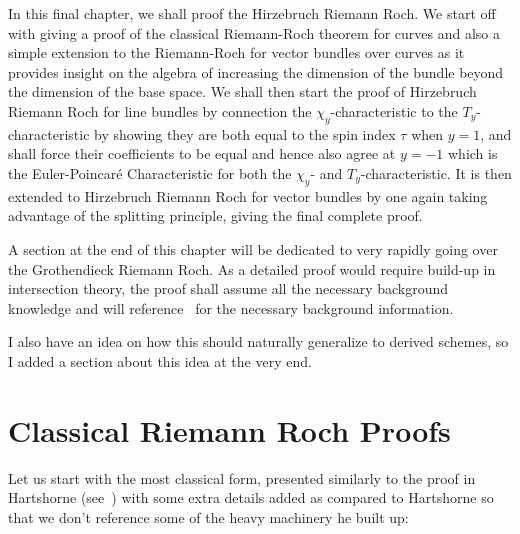 \documentclass{book}
\begin{document}
In this final chapter, we shall proof the Hirzebruch Riemann Roch. We start off with giving a proof of the
classical Riemann-Roch theorem for curves and also a simple extension to the Riemann-Roch for vector bundles
over curves as it provides insight on the algebra of increasing the dimension of the bundle beyond the
dimension of the base space. We shall then start the proof of Hirzebruch Riemann Roch for line bundles by connection the
$\chi_y$-characteristic to the $T_y$-characteristic by showing they are both equal to the spin index $\tau$
when $y =1$, and shall force their coefficients to be equal and hence also agree at $y=-1$ which is the
Euler-Poincar\'e Characteristic for both the $\chi_y$- and $T_y$-characteristic. It is then extended to
Hirzebruch Riemann Roch for vector bundles by one again taking advantage of the splitting principle, giving
the final complete proof.

A section at the end of this chapter will be dedicated to very rapidly going over the Grothendieck Riemann
Roch. As a detailed proof would require build-up in intersection theory, the proof shall assume all the
necessary background knowledge and will reference~\cite{fultonIntersectionTheory1984} for the necessary
background information.

I also have an idea on how this should naturally generalize to derived schemes, so I added a section about
this idea at the very end.


\section{Classical Riemann Roch Proofs}\label{sec:RR}

%

Let us start with the most classical form, presented similarly to the proof in Hartshorne
(see~\cite{hartshorneAlgebraicGeometry2013}) with some extra details added as compared to Hartshorne so that
we don't reference some of the heavy machinery he built up:
\end{document}
